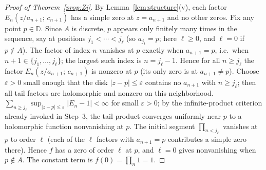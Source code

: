 \documentclass[12pt]{amsart}
\theoremstyle{definition}
\newcommand{\D}{\mathbb{D}}
\newcommand{\abs}[1]{\left|#1\right|}
\begin{document}
\begin{proof}[Proof of Theorem~\ref{prop:Zi}]
By Lemma~\ref{lem:structure}(v), each factor $E_n(z/a_{n+1};\,c_{n+1})$
has a simple zero at $z = a_{n+1}$ and no other zeros.  Fix any point
$p \in \D$.  Since $A$ is discrete, $p$ appears only finitely many
times in the sequence, say at positions $j_1 < \cdots < j_\ell$ (so
$a_{j_t} = p$; here $\ell \geq 0$, and $\ell = 0$ if $p \notin A$).
The factor of index $n$ vanishes at $p$ exactly when $a_{n+1} = p$,
i.e.\ when $n + 1 \in \{j_1,\ldots,j_\ell\}$; the largest such index is
$n = j_\ell - 1$.  Hence for all $n \geq j_\ell$ the factor
$E_n(z/a_{n+1};\,c_{n+1})$ is nonzero at $p$ (its only zero is at
$a_{n+1} \neq p$).  Choose
$\varepsilon > 0$ small enough that the disk $\abs{z - p} \leq
\varepsilon$ contains no $a_{n+1}$ with $n \geq j_\ell$; then all tail
factors are holomorphic and nonzero on this neighborhood.
$\sum_{n \geq j_\ell} \sup_{|z-p| \leq \varepsilon} |E_n - 1| < \infty$
for small $\varepsilon > 0$; by the infinite-product criterion already
invoked in Step~3, the tail product converges uniformly near $p$ to a
holomorphic function nonvanishing at $p$.  The initial segment
$\prod_{n < j_\ell}$ vanishes at $p$ to order $\ell$ (each of the
$\ell$ factors with $a_{n+1} = p$ contributes a simple zero there).
Hence $f$ has a zero of order $\ell$ at $p$, and $\ell = 0$ gives
nonvanishing when $p \notin A$.  The constant term is
$f(0) = \prod_n 1 = 1$.\end{proof}
\end{document}
